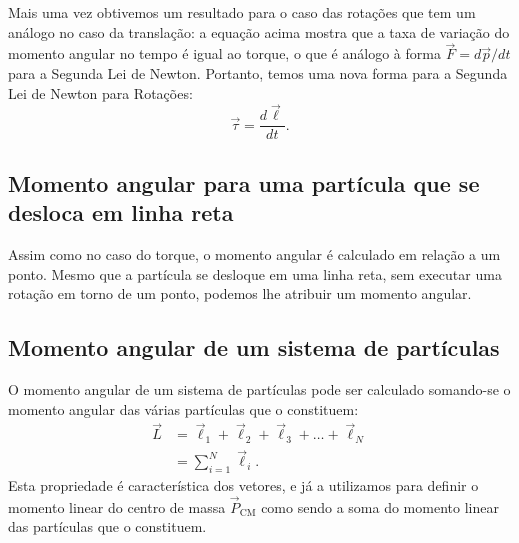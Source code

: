 Mais uma vez obtivemos um resultado para o caso das rotações que tem um análogo no caso da translação: a equação acima mostra que a taxa de variação do momento angular no tempo é igual ao torque, o que é análogo à forma $\vec{F} = d\vec{p}/dt$ para a Segunda Lei de Newton. Portanto, temos uma nova forma para a Segunda Lei de Newton para Rotações:
\begin{equation}\label{Eq:SegLeiNewtonRotDLDT}
  \vec{\tau} = \frac{d\vec{\ell}}{dt}.
\end{equation}


\subsection{Momento angular para uma partícula que se desloca em linha reta}

Assim como no caso do torque, o momento angular é calculado em relação a um ponto. Mesmo que a partícula se desloque em uma linha reta, sem executar uma rotação em torno de um ponto, podemos lhe atribuir um momento angular.

\subsection{Momento angular de um sistema de partículas}

O momento angular de um sistema de partículas pode ser calculado somando-se o momento angular das várias partículas que o constituem:
\begin{align}
  \vec{L} &= \vec{\ell}_1 + \vec{\ell}_2 + \vec{\ell}_3 + \dots + \vec{\ell}_N \\
  &= \sum_{i=1}^N \vec{\ell}_i.
\end{align}
%
Esta propriedade é característica dos vetores, e já a utilizamos para definir o momento linear do centro de massa $\vec{P}_{\textrm{CM}}$ como sendo a soma do momento linear das partículas que o constituem.

